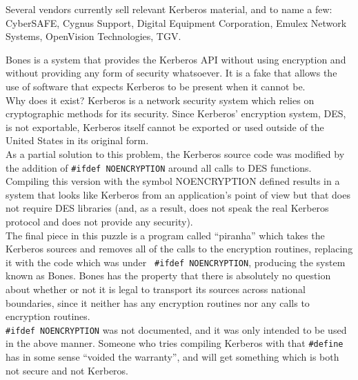 \begin{htmllist}
    Several vendors currently sell relevant Kerberos material, and to name
    a few: CyberSAFE, Cygnus Support, Digital Equipment Corporation, Emulex
    Network Systems, OpenVision Technologies, TGV.\\

    {\item[What is Bones? What is it for?]}

    Bones is a system that provides the Kerberos API without using
    encryption and without providing any form of security whatsoever. It is
    a fake that allows the use of software that expects Kerberos to be
    present when it cannot be.\\
    
    Why does it exist? Kerberos is a network security system which relies
    on cryptographic methods for its security. Since Kerberos' encryption
    system, DES, is not exportable, Kerberos itself cannot be exported or
    used outside of the United States in its original form.\\
    
    As a partial solution to this problem, the Kerberos source code was
    modified by the addition of {\tt \#ifdef NOENCRYPTION} around all calls
    to DES functions. Compiling this version with the symbol NOENCRYPTION
    defined results in a system that looks like Kerberos from an
    application's point of view but that does not require DES libraries
    (and, as a result, does not speak the real Kerberos protocol and does
    not provide
    any security).\\
    
    The final piece in this puzzle is a program called ``piranha'' which
    takes the Kerberos sources and removes all of the calls to the
    encryption routines, replacing it with the code which was under {\tt
      \#ifdef NOENCRYPTION}, producing the system known as Bones. Bones has
    the property that there is absolutely no question about whether or not
    it is legal to transport its sources across national boundaries, since
    it neither has any encryption routines nor any calls to encryption
    routines.\\
    
    {\tt \#ifdef NOENCRYPTION} was not documented, and it was only intended
    to be used in the above manner. Someone who tries compiling Kerberos
    with that {\tt \#define} has in some sense ``voided the warranty'', and
    will get something which is both not secure and not Kerberos.
\end{htmllist}



